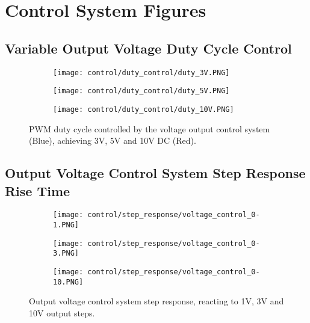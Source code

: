 \chapter{Control System Figures}\label{A:control}
\vspace{-20pt}

\section*{Variable Output Voltage Duty Cycle Control} \label{A:control_duty}

\begin{figure}[H]
    
    \centering
    \begin{subfigure}{0.5\textwidth}
        \texttt{[image: control/duty\_control/duty\_3V.PNG]}
    \end{subfigure}
    \begin{subfigure}{0.5\textwidth}
        \texttt{[image: control/duty\_control/duty\_5V.PNG]}
    \end{subfigure}
    \begin{subfigure}{0.5\textwidth}
        \texttt{[image: control/duty\_control/duty\_10V.PNG]}
    \end{subfigure}
    \caption{PWM duty cycle controlled by the voltage output control system (Blue), achieving 3V, 5V and 10V DC (Red).}
\end{figure}

\section*{Output Voltage Control System Step Response Rise Time} \label{A:control_step_rise}
\begin{figure}[H]
    \centering
    \begin{subfigure}{0.62\textwidth}
        \texttt{[image: control/step\_response/voltage\_control\_0-1.PNG]}
    \end{subfigure}
    \begin{subfigure}{0.62\textwidth}
        \texttt{[image: control/step\_response/voltage\_control\_0-3.PNG]}
    \end{subfigure}
    \begin{subfigure}{0.62\textwidth}
        \texttt{[image: control/step\_response/voltage\_control\_0-10.PNG]}
    \end{subfigure}
    \caption{Output voltage control system step response, reacting to 1V, 3V and 10V output steps.}
\end{figure}

